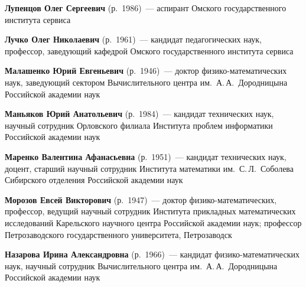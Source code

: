 \begin{multicols}{2}
\vspace*{4pt}

\noindent
\textbf{Лупенцов Олег Сергеевич} (р.\ 1986)~---
аспирант Омского государственного института сервиса

\vspace*{4pt}

\noindent
\textbf{Лучко Олег Николаевич} (р.\ 1961)~---
кандидат педагогических наук, профессор, заведующий кафедрой 
Омского государственного института сервиса

\vspace*{4pt}

\noindent
\textbf{Малашенко Юрий Евгеньевич} (р.\ 1946)~---
доктор фи\-зи\-ко-ма\-те\-ма\-ти\-че\-ских наук, заведующий сектором 
Вычислительного центра им.\ А.\,А.~Дородницына Российской академии наук

\vspace*{4pt}

\noindent
\textbf{Маньяков Юрий Анатольевич} (р.\ 1984)~---
кандидат технических наук, научный сотрудник Орловского филиала Института проб\-лем информатики
Российской академии наук

\vspace*{4pt}

\noindent
\textbf{Маренко Валентина Афанасьевна} (р.\ 1951)~---
кандидат технических наук, доцент, старший научный сотрудник 
Института математики им.\ С.\,Л.~Соболева Сибирского отделения Российской академии наук

\vspace*{3pt}

\noindent 
\textbf{Морозов Евсей Викторович} (р.\ 1947)~--- доктор 
фи\-зи\-ко-ма\-те\-ма\-ти\-че\-ских, профессор, ведущий научный сотрудник 
Института прикладных математических исследований Карельского научного центра Российской
академии наук; 
профессор Петрозаводского государственного университета, Петрозаводск


\vspace*{3pt}

\noindent
\textbf{Назарова Ирина Александровна} (р.\ 1966)~---
кандидат фи\-зи\-ко-ма\-те\-ма\-ти\-че\-ских наук, 
научный сотрудник Вычислительного центра им.\ А.\,А.~Дородницына Российской академии наук 


\end{multicols}
